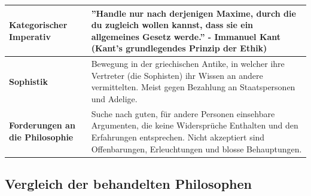 \begin{longtable}{|>{\bfseries}p{}||p{}|}
			\hline
			Kategorischer Imperativ
				& ''Handle nur nach derjenigen Maxime, durch die du zugleich wollen kannst, dass sie ein allgemeines Gesetz werde.'' - Immanuel Kant (Kant's grundlegendes Prinzip der Ethik)\\
			\hline
			Sophistik
				& Bewegung in der griechischen Antike, in welcher ihre Vertreter (die Sophisten) ihr Wissen an andere vermittelten. Meist gegen Bezahlung an Staatspersonen und Adelige.\\
			\hline
			Forderungen an die Philosophie
				& Suche nach guten, für andere Personen einsehbare Argumenten, die keine Widersprüche Enthalten und den Erfahrungen entsprechen.\newline
					Nicht akzeptiert sind Offenbarungen, Erleuchtungen und blosse Behauptungen.\\
			\hline
		\end{longtable}
		
	\subsection{Vergleich der behandelten Philosophen}
		

